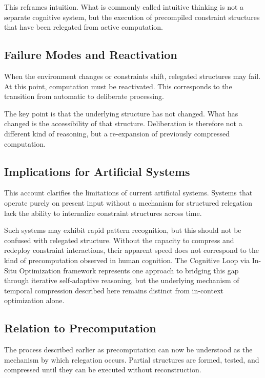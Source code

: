 \documentclass[11pt]{article}
\theoremstyle{plain}
\theoremstyle{definition}
\theoremstyle{remark}
\begin{document}
This reframes intuition. What is commonly called intuitive thinking is
not a separate cognitive system, but the execution of precompiled
constraint structures that have been relegated from active computation.

\subsection{Failure Modes and Reactivation}

When the environment changes or constraints shift, relegated structures
may fail. At this point, computation must be reactivated. This corresponds
to the transition from automatic to deliberate processing.

The key point is that the underlying structure has not changed. What has
changed is the accessibility of that structure. Deliberation is therefore
not a different kind of reasoning, but a re-expansion of previously
compressed computation.

\subsection{Implications for Artificial Systems}

This account clarifies the limitations of current artificial systems.
Systems that operate purely on present input without a mechanism for
structured relegation lack the ability to internalize constraint
structures across time.

Such systems may exhibit rapid pattern recognition, but this should not
be confused with relegated structure. Without the capacity to compress
and redeploy constraint interactions, their apparent speed does not
correspond to the kind of precomputation observed in human cognition.
The Cognitive Loop via In-Situ Optimization framework \cite{cheng2025clio}
represents one approach to bridging this gap through iterative self-adaptive
reasoning, but the underlying mechanism of temporal compression described
here remains distinct from in-context optimization alone.

\subsection{Relation to Precomputation}

The process described earlier as precomputation can now be understood
as the mechanism by which relegation occurs. Partial structures are
formed, tested, and compressed until they can be executed without
reconstruction.
\end{document}
